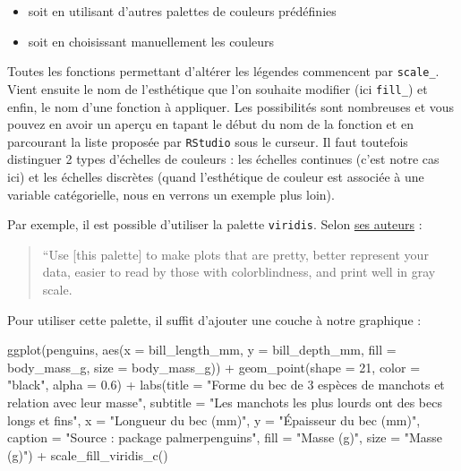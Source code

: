 \documentclass[
  a4paper,
  DIV=11,
  numbers=noendperiod,
  oneside]{scrreprt}
\newenvironment{Shaded}{}{}
\newcommand{\AttributeTok}[1]{\textcolor[rgb]{0.84,0.23,0.29}{#1}}
\newcommand{\DecValTok}[1]{\textcolor[rgb]{0.00,0.36,0.77}{#1}}
\newcommand{\FloatTok}[1]{\textcolor[rgb]{0.00,0.36,0.77}{#1}}
\newcommand{\FunctionTok}[1]{\textcolor[rgb]{0.44,0.26,0.76}{#1}}
\newcommand{\NormalTok}[1]{\textcolor[rgb]{0.14,0.16,0.18}{#1}}
\newcommand{\SpecialCharTok}[1]{\textcolor[rgb]{0.00,0.36,0.77}{#1}}
\newcommand{\StringTok}[1]{\textcolor[rgb]{0.01,0.18,0.38}{#1}}
\providecommand{\tightlist}{%
  \setlength{\itemsep}{0pt}\setlength{\parskip}{0pt}}\usepackage{longtable,booktabs,array}
\begin{document}
\begin{itemize}
\tightlist
\item
  soit en utilisant d'autres palettes de couleurs prédéfinies
\item
  soit en choisissant manuellement les couleurs
\end{itemize}

Toutes les fonctions permettant d'altérer les légendes commencent par
\texttt{scale\_}. Vient ensuite le nom de l'esthétique que l'on souhaite
modifier (ici \texttt{fill\_}) et enfin, le nom d'une fonction à
appliquer. Les possibilités sont nombreuses et vous pouvez en avoir un
aperçu en tapant le début du nom de la fonction et en parcourant la
liste proposée par \texttt{RStudio} sous le curseur. Il faut toutefois
distinguer 2 types d'échelles de couleurs : les échelles continues
(c'est notre cas ici) et les échelles discrètes (quand l'esthétique de
couleur est associée à une variable catégorielle, nous en verrons un
exemple plus loin).

Par exemple, il est possible d'utiliser la palette \texttt{viridis}.
Selon
\href{https://cran.r-project.org/web/packages/viridis/vignettes/intro-to-viridis.html}{ses
auteurs} :

\begin{quote}
``Use {[}this palette{]} to make plots that are pretty, better represent
your data, easier to read by those with colorblindness, and print well
in gray scale.
\end{quote}

Pour utiliser cette palette, il suffit d'ajouter une couche à notre
graphique :

\begin{Shaded}
\begin{Highlighting}[]
\FunctionTok{ggplot}\NormalTok{(penguins, }\FunctionTok{aes}\NormalTok{(}\AttributeTok{x =}\NormalTok{ bill\_length\_mm, }\AttributeTok{y =}\NormalTok{ bill\_depth\_mm,}
                     \AttributeTok{fill =}\NormalTok{ body\_mass\_g, }\AttributeTok{size =}\NormalTok{ body\_mass\_g)) }\SpecialCharTok{+}
  \FunctionTok{geom\_point}\NormalTok{(}\AttributeTok{shape =} \DecValTok{21}\NormalTok{, }\AttributeTok{color =} \StringTok{"black"}\NormalTok{, }\AttributeTok{alpha =} \FloatTok{0.6}\NormalTok{) }\SpecialCharTok{+}
  \FunctionTok{labs}\NormalTok{(}\AttributeTok{title =} \StringTok{"Forme du bec de 3 espèces de manchots et relation avec leur masse"}\NormalTok{,}
       \AttributeTok{subtitle =} \StringTok{"Les manchots les plus lourds ont des becs longs et fins"}\NormalTok{,}
       \AttributeTok{x =} \StringTok{"Longueur du bec (mm)"}\NormalTok{,}
       \AttributeTok{y =} \StringTok{"Épaisseur du bec (mm)"}\NormalTok{,}
       \AttributeTok{caption =} \StringTok{"Source :  package \textquotesingle{}palmerpenguins\textquotesingle{}"}\NormalTok{,}
       \AttributeTok{fill =} \StringTok{"Masse (g)"}\NormalTok{,}
       \AttributeTok{size =} \StringTok{"Masse (g)"}\NormalTok{) }\SpecialCharTok{+}
  \FunctionTok{scale\_fill\_viridis\_c}\NormalTok{()}
\end{Highlighting}
\end{Shaded}
\end{document}
